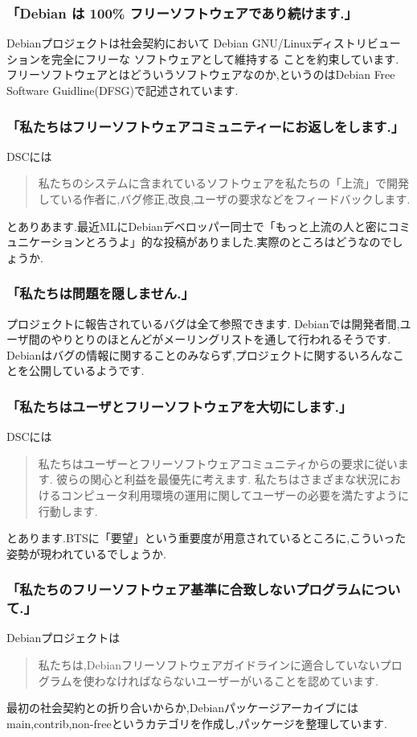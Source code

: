 \documentclass[mingoth]{jsarticle}
\begin{document}
\subsubsection{「Debian は 100\% フリーソフトウェアであり続けます.」}
Debianプロジェクトは社会契約において
Debian GNU/Linuxディストリビューションを完全にフリーな ソフトウェアとして維持する
ことを約束しています.
フリーソフトウェアとはどういうソフトウェアなのか,というのはDebian Free Software Guidline(DFSG)で記述されています.

\subsubsection{「私たちはフリーソフトウェアコミュニティーにお返しをします.」}
DSCには
\begin{quote}
私たちのシステムに含まれているソフトウェアを私たちの「上流」で開発している作者に,バグ修正,改良,ユーザの要求などをフィードバックします.
\end{quote}
とありあます.最近MLにDebianデベロッパー同士で「もっと上流の人と密にコミュニケーションとろうよ」的な投稿がありました.実際のところはどうなのでしょうか.

\subsubsection{「私たちは問題を隠しません.」}
プロジェクトに報告されているバグは全て参照できます.
Debianでは開発者間,ユーザ間のやりとりのほとんどがメーリングリストを通して行われるそうです.
Debianはバグの情報に関することのみならず,プロジェクトに関するいろんなことを公開しているようです.

\subsubsection{「私たちはユーザとフリーソフトウェアを大切にします.」}
DSCには
\begin{quote}
私たちはユーザーとフリーソフトウェアコミュニティからの要求に従います.
彼らの関心と利益を最優先に考えます.
私たちはさまざまな状況におけるコンピュータ利用環境の運用に関してユーザーの必要を満たすように行動します.
\end{quote}
とあります.BTSに「要望」という重要度が用意されているところに,こういった姿勢が現われているでしょうか.

\subsubsection{「私たちのフリーソフトウェア基準に合致しないプログラムについて.」}
Debianプロジェクトは
\begin{quote}
私たちは,Debianフリーソフトウェアガイドラインに適合していないプログラムを使わなければならないユーザーがいることを認めています.
\end{quote}
最初の社会契約との折り合いからか,Debianパッケージアーカイブにはmain,contrib,non-freeというカテゴリを作成し,パッケージを整理しています.
\end{document}
